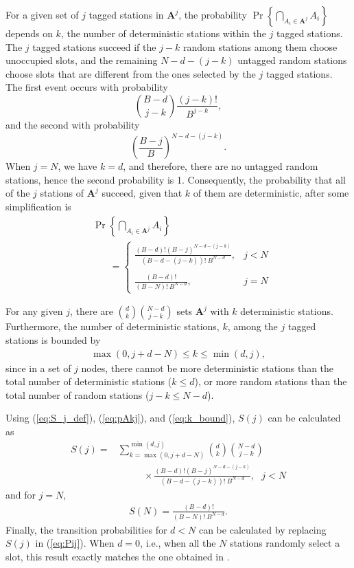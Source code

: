 \documentclass[journal]{IEEEtran}
\def\Abf{{\mathbf{A}}}
\newcommand{\pr}[1]{\Pr \left\{#1\right\}}
\begin{document}
For a given set of $j$ tagged stations in $\Abf^{j}$, the probability $\pr{\bigcap_{A_i \in \Abf^{j}} A_i}$ depends on $k$, the number of deterministic stations within the $j$ tagged stations. The $j$ tagged stations succeed if the $j-k$ random stations among them choose unoccupied slots, and the remaining $N-d-(j-k)$ untagged random stations choose slots that are different from the ones selected by the $j$ tagged stations. The first event occurs with probability $$\binom{B-d}{j-k} \frac{(j-k)!}{B^{j-k}},$$ and the second with probability $$\left(\frac{B-j}{B} \right)^{N-d-(j-k)}.$$
When $j=N$, we have $k=d$, and therefore, there are no untagged random stations, hence the second probability is 1. Consequently, the probability that all of the $j$ stations of $\Abf^{j}$ succeed, given that $k$ of them are deterministic, after some simplification is
\begin{align}
\label{eq:pAkj}
&\pr{\bigcap_{A_i \in \Abf^{j}} A_i} \\
&~~~~~~~~= \left \{ \begin{array}{lr}
    \displaystyle \frac{(B-d)!(B-j)^{N-d-(j-k)}}{\left(B-d-(j-k)\right)!~B^{N-d}}, & j < N \\&\\
    \displaystyle \frac{(B-d)!}{(B-N)!~B^{N-d}}, & j = N
\end{array}
\right. \nonumber
\end{align}

For any given $j$, there are $\binom{d}{k} \binom{N-d}{j-k}$ sets $\Abf^{j}$ with $k$ deterministic stations. Furthermore, the number of deterministic stations, $k$, among the $j$ tagged stations is bounded by
\begin{align}
\label{eq:k_bound}
\max(0,j+d-N) \leq k \leq \min(d,j),
\end{align}
since in a set of $j$ nodes, there cannot be more deterministic stations than the total number of deterministic stations ($k \leq d$), or more random stations than the total number of random stations ($j-k \leq N-d$).


Using (\ref{eq:S_j_def}), (\ref{eq:pAkj}), and (\ref{eq:k_bound}), $S(j)$ can be calculated as
\begin{align}
\label{eq:S_j}
S(j) = &\sum_{k=\max(0,j+d-N)}^{\min(d,j)}   \binom{d}{k} \binom{N-d}{j-k}\\
 & ~~~~~~~~~~~~\times \frac{(B-d)!(B-j)^{N-d-(j-k)}}{\left(B-d-(j-k)\right)!~B^{N-d}}, ~~~ j < N \nonumber
\end{align}
and for $j=N$,
\begin{align}
\label{eq:S_N}
S(N) = \frac{(B-d)!}{(B-N)!~B^{N-d}}.
\end{align}
Finally, the transition probabilities for $d<N$ can be calculated by replacing $S(j)$ in (\ref{eq:Pij}). 
When $d=0$, i.e., when all the $N$ stations randomly select a slot, this result exactly matches the one obtained in \cite{szpankowski1983asc}.
\end{document}
